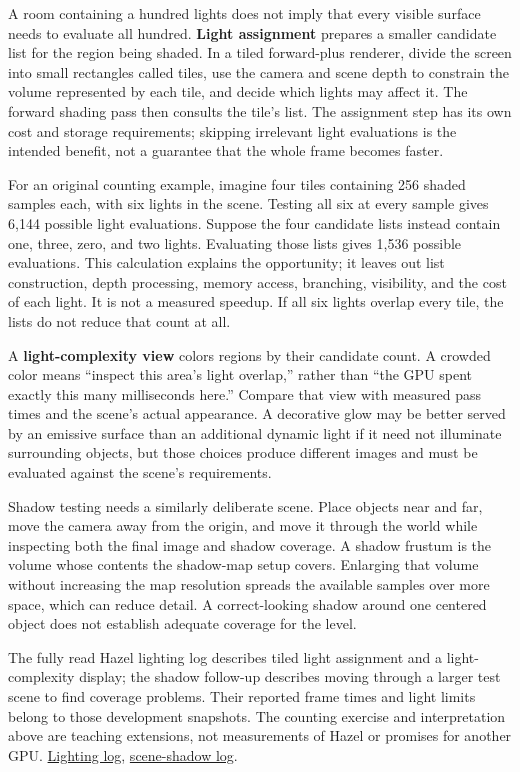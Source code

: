 A room containing a hundred lights does not imply that every visible surface needs to evaluate all hundred. \textbf{Light assignment} prepares a smaller candidate list for the region being shaded. In a tiled forward-plus renderer, divide the screen into small rectangles called tiles, use the camera and scene depth to constrain the volume represented by each tile, and decide which lights may affect it. The forward shading pass then consults the tile's list. The assignment step has its own cost and storage requirements; skipping irrelevant light evaluations is the intended benefit, not a guarantee that the whole frame becomes faster.

For an original counting example, imagine four tiles containing 256 shaded samples each, with six lights in the scene. Testing all six at every sample gives 6,144 possible light evaluations. Suppose the four candidate lists instead contain one, three, zero, and two lights. Evaluating those lists gives 1,536 possible evaluations. This calculation explains the opportunity; it leaves out list construction, depth processing, memory access, branching, visibility, and the cost of each light. It is not a measured speedup. If all six lights overlap every tile, the lists do not reduce that count at all.

A \textbf{light-complexity view} colors regions by their candidate count. A crowded color means ``inspect this area's light overlap,'' rather than ``the GPU spent exactly this many milliseconds here.'' Compare that view with measured pass times and the scene's actual appearance. A decorative glow may be better served by an emissive surface than an additional dynamic light if it need not illuminate surrounding objects, but those choices produce different images and must be evaluated against the scene's requirements.

Shadow testing needs a similarly deliberate scene. Place objects near and far, move the camera away from the origin, and move it through the world while inspecting both the final image and shadow coverage. A shadow frustum is the volume whose contents the shadow-map setup covers. Enlarging that volume without increasing the map resolution spreads the available samples over more space, which can reduce detail. A correct-looking shadow around one centered object does not establish adequate coverage for the level.

The fully read Hazel lighting log describes tiled light assignment and a light-complexity display; the shadow follow-up describes moving through a larger test scene to find coverage problems. Their reported frame times and light limits belong to those development snapshots. The counting exercise and interpretation above are teaching extensions, not measurements of Hazel or promises for another GPU. \href{https://www.youtube.com/watch?v=e0YTiO0Ur4o}{Lighting log}, \href{https://www.youtube.com/watch?v=16zctOwxGXM}{scene-shadow log}.

